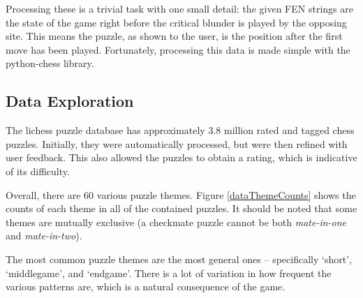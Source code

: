 Processing these is a trivial task with one small detail: the given FEN strings
are the state of the game right before the critical blunder is played by the
opposing site. This means the puzzle, as shown to the user, is the position
after the first move has been played. Fortunately, processing this data is made
simple with the python-chess library.\cite{pythonChess}

\subsection{Data Exploration}

The lichess puzzle database has approximately 3.8 million rated and tagged
chess puzzles. Initially, they were automatically
processed,\cite{lichessTagger} but were then refined with user
feedback.\cite{lichessPuzzles} This also allowed the puzzles to obtain a
rating, which is indicative of its difficulty.\cite{lichessPuzzles}

Overall, there are 60 various puzzle themes.\cite{lichessXML} Figure
\ref{dataThemeCounts} shows the counts of each theme in all of the contained
puzzles. It should be noted that some themes are mutually exclusive (a
checkmate puzzle cannot be both \emph{mate-in-one} and \emph{mate-in-two}).

The most common puzzle themes are the most general ones -- specifically
`short', `middlegame', and `endgame'. There is a lot of variation in how
frequent the various patterns are, which is a natural consequence of the game.

